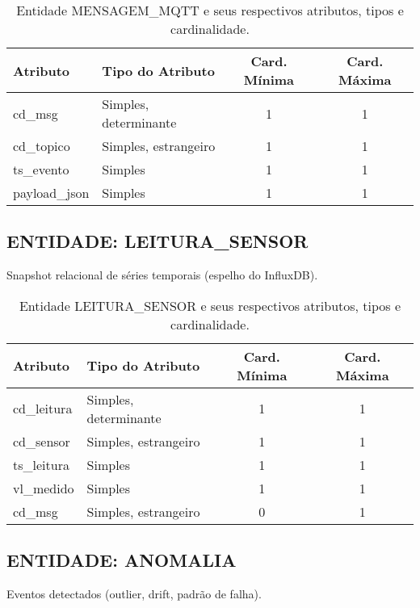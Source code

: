 \documentclass[10pt,a4paper]{article}
\begin{document}
\begin{table}[h!]
\centering
\begin{tabular}{| l | l | c | c |}
\hline
\rowcolor{red}\color{white}\textbf{Atributo} & \color{white}\textbf{Tipo do Atributo} & \color{white}\textbf{Card. Mínima} & \color{white}\textbf{Card. Máxima} \\
\hline
cd\_msg & Simples, determinante & 1 & 1 \\
cd\_topico & Simples, estrangeiro & 1 & 1 \\
ts\_evento & Simples & 1 & 1 \\
payload\_json & Simples & 1 & 1 \\
\hline
\end{tabular}
\caption{Entidade MENSAGEM\_MQTT e seus respectivos atributos, tipos e cardinalidade.}
\label{tab:mensagem_mqtt}
\end{table}

\subsection*{ENTIDADE: LEITURA\_SENSOR}
Snapshot relacional de séries temporais (espelho do InfluxDB).

\begin{table}[h!]
\centering
\begin{tabular}{| l | l | c | c |}
\hline
\rowcolor{red}\color{white}\textbf{Atributo} & \color{white}\textbf{Tipo do Atributo} & \color{white}\textbf{Card. Mínima} & \color{white}\textbf{Card. Máxima} \\
\hline
cd\_leitura & Simples, determinante & 1 & 1 \\
cd\_sensor & Simples, estrangeiro & 1 & 1 \\
ts\_leitura & Simples & 1 & 1 \\
vl\_medido & Simples & 1 & 1 \\
cd\_msg & Simples, estrangeiro & 0 & 1 \\
\hline
\end{tabular}
\caption{Entidade LEITURA\_SENSOR e seus respectivos atributos, tipos e cardinalidade.}
\label{tab:leitura_sensor}
\end{table}

\subsection*{ENTIDADE: ANOMALIA}
Eventos detectados (outlier, drift, padrão de falha).
\end{document}

